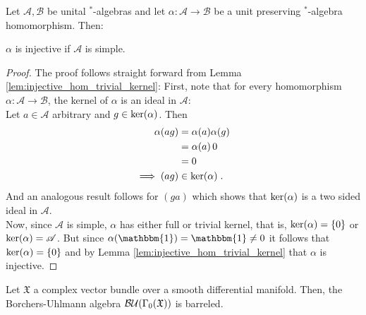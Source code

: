 %
\begin{lemma}\label{lem:injective_mor_simple_algebra}
	Let $\mathscr{A},\mathscr{B}$ be unital $^*$-algebras and let $\alpha : \mathscr{A} \to \mathscr{B}$ be a unit preserving $^*$-algebra homomorphism.
	Then: \\
	\begin{center}
		$\alpha$ is injective if $\mathscr{A}$ is simple.
	\end{center}
\end{lemma}
\begin{proof}
	The proof follows straight forward from Lemma \ref{lem:injective_hom_trivial_kernel}:
	First, note that for every homomorphism $\alpha : \mathscr{A} \to \mathscr{B}$, the kernel of $\alpha$ is an ideal in $\mathscr{A}$:\\
	Let $a \in \mathscr{A}$ arbitrary and $g \in \mathrm{ker}{}(\alpha)$. Then
	\begin{align}
		\alpha(ag)
		&= \alpha(a) \alpha(g) \notag\\
		&= \alpha(a)\,0 \notag\\
		&= 0 \notag\\
		\implies (ag) &\in \mathrm{ker}{}(\alpha)\;.
	\end{align}
	And an analogous result follows for $(ga)$ which shows that $\mathrm{ker}{}(\alpha)$ is a two sided ideal in $\mathscr{A}$.\\
	Now, since $\mathscr{A}$ is simple, $\alpha$ has either full or trivial kernel, that is, $\mathrm{ker}{}(\alpha) = \{0 \}$ or $\mathrm{ker}{}(\alpha) = \mathscr{A}$. But since $\alpha(\mathbbm{1}) = \mathbbm{1} \neq 0$ it follows that $\mathrm{ker}{}(\alpha) = \{0 \}$ and by Lemma \ref{lem:injective_hom_trivial_kernel} that $\alpha$ is injective.
\end{proof}
%
\begin{lemma}\label{lem:BU-algebra-barreled}
	Let $\mathfrak{X}$ a complex vector bundle over a smooth differential manifold. Then, the Borchers-Uhlmann algebra $\mathcal{BU}(\Gamma_0(\mathfrak{X}))$ is barreled.
\end{lemma}
